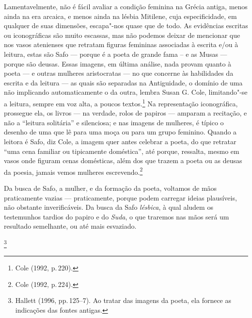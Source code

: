 Lamentavelmente, não é fácil avaliar a condição feminina na Grécia
antiga, menos ainda na era arcaica, e menos ainda na lésbia Mitilene, cuja
especificidade, em qualquer de suas dimensões, escapa"-nos quase que
de todo. As evidências escritas ou iconográficas são muito
escassas, mas não podemos deixar de mencionar que nos vasos atenienses que
retratam figuras femininas associadas à escrita e/ou à leitura, estas são Safo
--- porque é a poeta de grande fama -- e as Musas --- porque são deusas.
Essas imagens, em última análise, nada provam quanto à poeta --- e outras mulheres
aristocratas --- no que concerne às habilidades da escrita e da leitura --- as
quais são separadas na Antiguidade, o domínio de uma não implicando
automaticamente o da outra, lembra Susan G. Cole, limitando"-se a
leitura, sempre em voz alta, a poucos textos.\footnote{ Cole (1992, p.\,220).} Na representação iconográfica,
prossegue ela, os livros --- na verdade, rolos de papiros --- amparam a
recitação, e não a “leitura solitária” e silenciosa; e nas imagens de mulheres,
é típico o desenho de uma que lê para uma moça ou para um grupo feminino.
Quando a leitora é Safo, diz Cole, a imagem quer antes celebrar a poeta, do que
retratar “uma cena familiar ou tipicamente doméstica”, até porque, ressalta,
mesmo em vasos onde figuram cenas domésticas, além dos que trazem a poeta ou as
deusas da poesia, jamais vemos mulheres escrevendo.\footnote{ Cole (1992, p.\,224).}

Da busca de Safo, a mulher, e da formação da poeta, voltamos de mãos
praticamente vazias --- praticamente, porque podem carregar ideias plausíveis,
não obstante inverificáveis. Da busca da Safo \emph{lésbica}, à qual
aludem os testemunhos tardios do papiro e do \emph{Suda}, o que traremos nas
mãos será um resultado semelhante, ou até mais esvaziado.

\footnote{ Hallett (1996, pp.\,125--7). Ao tratar das
imagens da poeta, ela fornece as indicações das fontes antigas.}  

